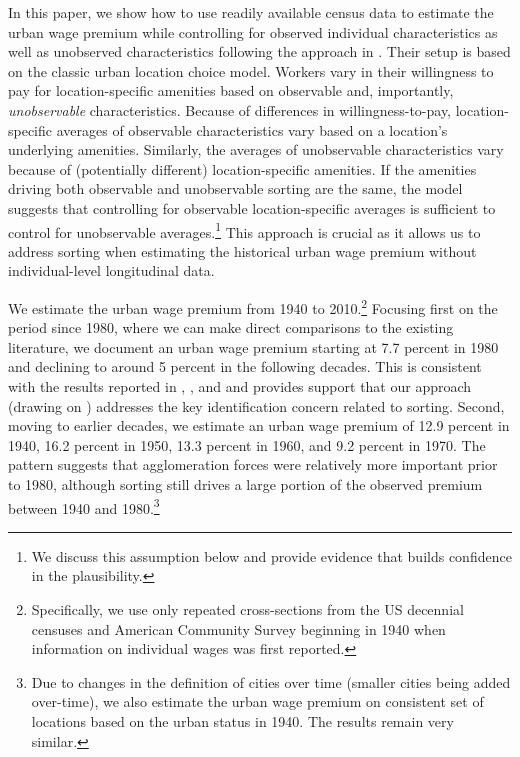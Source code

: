 \documentclass[12pt]{article}
\newcommand{\kyle}[1]{\iftoggle{INCLUDECOMMENTS}{{\color{magenta}\textbf{Kyle:} #1}}{}}
\begin{document}
In this paper, we show how to use readily available census data to estimate the urban wage premium while controlling for observed individual characteristics as well as unobserved characteristics following the approach in \citet*{altonji2018estimating}.
Their setup is based on the classic urban location choice model. 
Workers vary in their willingness to pay for location-specific amenities based on observable and, importantly, \emph{unobservable} characteristics.
Because of differences in willingness-to-pay, location-specific averages of observable characteristics vary based on a location's underlying amenities. 
Similarly, the averages of unobservable characteristics vary because of (potentially different) location-specific amenities. 
If the amenities driving both observable and unobservable sorting are the same, the model suggests that controlling for observable location-specific averages is sufficient to control for unobservable averages.\footnote{
  We discuss this assumption below and provide evidence that builds confidence in the plausibility.
}
This approach is crucial as it allows us to address sorting when estimating the historical urban wage premium without individual-level longitudinal data.

We estimate the urban wage premium from 1940 to 2010.\footnote{
  Specifically, we use only repeated cross-sections from the US decennial censuses and American Community Survey beginning in 1940 when information on individual wages was first reported.
}
Focusing first on the period since 1980, where we can make direct comparisons to the existing literature, we document an urban wage premium starting at 7.7 percent in 1980 and declining to around 5 percent in the following decades.
This is consistent with the results reported in \citet*{Glaeser_Mare_2001}, \cite*{Yankow_2006}, and \citet*{BaumSnow_Pavan_2012} and provides support that our approach (drawing on \citet*{altonji2018estimating}) addresses the key identification concern related to sorting.
Second, moving to earlier decades, we estimate an urban wage premium of 12.9 percent in 1940, 16.2 percent in 1950, 13.3 percent in 1960, and 9.2 percent in 1970. %
The pattern suggests that agglomeration forces were relatively more important prior to 1980, although sorting still drives a large portion of the observed premium between 1940 and 1980.\footnote{
  Due to changes in the definition of cities over time (smaller cities being added over-time), we also estimate the urban wage premium on consistent set of locations based on the urban status in 1940. 
  The results remain very similar.
}
\end{document}
